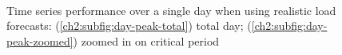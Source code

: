 \begin{figure}\centering
	\\
	\caption{Time series performance over a single day when using realistic load forecasts: (\ref{ch2:subfig:day-peak-total}) total day; (\ref{ch2:subfig:day-peak-zoomed}) zoomed in on critical period}
	\label{ch2:fig:day-peak}
\end{figure}